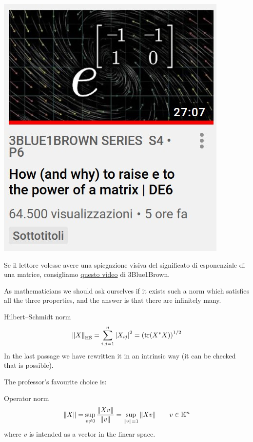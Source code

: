 \documentclass[../main.tex]{subfiles}
\begin{document}
\begin{marginfigure}[-30mm]
	\includegraphics[width=1\linewidth]{images/3blue.jpg}
	\caption[3Blue1Brown video]{Se il lettore volesse avere una spiegazione visiva del significato di esponenziale di una matrice, consigliamo \href{https://www.youtube.com/watch?v=O85OWBJ2ayo}{questo video} di 3Blue1Brown.}
\end{marginfigure}
As mathematicians we should ask ourselves if it exists such a norm which satisfies all the three properties, and the answer is that there are infinitely many.
\begin{example}
Hilbert–Schmidt norm
\[
\norm{X}_{\textrm{HS}}=\sum_{i,j=1}^n \abs{X_{ij}}^2=\left(\tr(X^\ast X)\right)^{1/2}
\]
In the last passage we have rewritten it in an intrinsic way (it can be checked that is possible).
\end{example}
The professor's favourite choice is:
\begin{example}Operator norm
\[
\norm{X}=\sup_{v\neq 0}\frac{\norm{Xv}}{\norm{v}}=\sup_{\norm{v}=1}\norm{Xv} \qquad v\in\mathbb{K}^n
\]
where $v$ is intended as a vector in the linear space.
\end{example}
\end{document}

